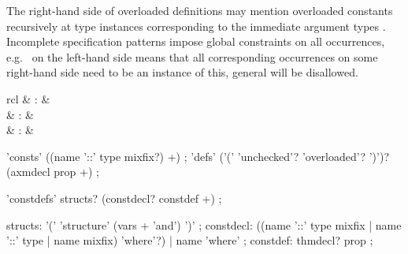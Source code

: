 \begin{isabellebody}
\begin{isamarkuptext}
  The right-hand side of overloaded definitions may mention overloaded constants
  recursively at type instances corresponding to the immediate
  argument types .  Incomplete
  specification patterns impose global constraints on all occurrences,
  e.g.\  on the left-hand side means that all
  corresponding occurrences on some right-hand side need to be an
  instance of this, general  will be disallowed.

  \begin{matharray}{rcl}
    \hypertarget{command.consts}{\hyperlink{command.consts}{\mbox{}}} & : &  \\
    \hypertarget{command.defs}{\hyperlink{command.defs}{\mbox{}}} & : &  \\
    \hypertarget{command.constdefs}{\hyperlink{command.constdefs}{\mbox{}}} & : &  \\
  \end{matharray}

  \begin{rail}
    'consts' ((name '::' type mixfix?) +)
    ;
    'defs' ('(' 'unchecked'? 'overloaded'? ')')? \\ (axmdecl prop +)
    ;
  \end{rail}

  \begin{rail}
    'constdefs' structs? (constdecl? constdef +)
    ;

    structs: '(' 'structure' (vars + 'and') ')'
    ;
    constdecl:  ((name '::' type mixfix | name '::' type | name mixfix) 'where'?) | name 'where'
    ;
    constdef: thmdecl? prop
    ;
  \end{rail}

  \begin{description}


\end{description}
\end{isamarkuptext}
\end{isabellebody}
